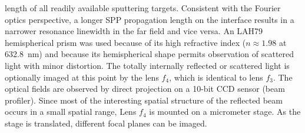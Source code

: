 length of all readily available sputtering targets.
Consistent with the Fourier optics perspective, a longer SPP propagation
length on the interface results in a narrower resonance linewidth in the
far field and vice versa.  An LAH79 hemispherical prism was used because of
its high refractive index ($n\approx 1.98$ at \SI{632.8}{\nano\meter}) and
because its hemispherical shape permits observation of scattered light with
minor distortion.  The totally internally reflected or scattered light is
optionally imaged at this point by the lens $f_4$, which is identical to
lens $f_3$.  The optical fields are observed by direct projection on a 10-bit
CCD sensor (beam profiler).  Since most of the interesting spatial structure of the
reflected beam occurs in a small spatial range, Lens $f_4$
is mounted on a micrometer stage.  As the stage is translated, different focal
planes can be imaged.

